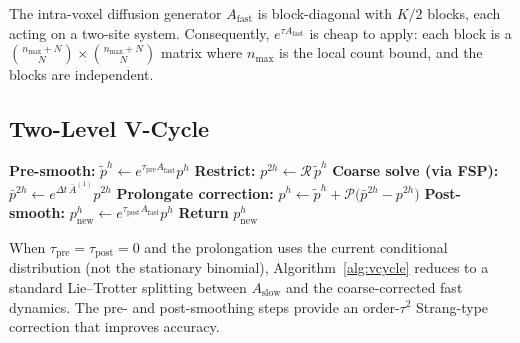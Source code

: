 \documentclass[review,onefignum,onetabnum]{siamart171218}
\newcommand{\calR}{\mathcal{R}}
\newcommand{\calP}{\mathcal{P}}
\begin{document}
The intra-voxel diffusion generator $A_{\mathrm{fast}}$ is
block-diagonal with $K/2$ blocks, each acting on a two-site
system.  Consequently, $e^{\tau A_{\mathrm{fast}}}$ is cheap to
apply: each block is a $\binom{n_{\max}+N}{N} \times \binom{n_{\max}+N}{N}$ matrix where $n_{\max}$ is the local count
bound, and the blocks are independent.

\subsection{Two-Level V-Cycle}

\begin{algorithm}[H]
  \caption{Two-Level Multigrid V-Cycle
    $\mathbf{MG2}(p^h, t, \Delta t; \tau_{\mathrm{pre}}, \tau_{\mathrm{post}})$}
  \label{alg:vcycle}
  \begin{algorithmic}[1]
    \STATE \textbf{Pre-smooth:}
      $\tilde{p}^h \leftarrow e^{\tau_{\mathrm{pre}} A_{\mathrm{fast}}} p^h$
    \STATE \textbf{Restrict:}
      $p^{2h} \leftarrow \calR\, \tilde{p}^h$
    \STATE \textbf{Coarse solve (via FSP):}
      $\bar{p}^{2h} \leftarrow e^{\Delta t\, \bar{A}^{(1)}} p^{2h}$
    \STATE \textbf{Prolongate correction:}
      $p^h \leftarrow \tilde{p}^h + \calP\bigl(\bar{p}^{2h} - p^{2h}\bigr)$
    \STATE \textbf{Post-smooth:}
      $p^h_{\mathrm{new}} \leftarrow e^{\tau_{\mathrm{post}} A_{\mathrm{fast}}} p^h$
    \STATE \textbf{Return} $p^h_{\mathrm{new}}$
  \end{algorithmic}
\end{algorithm}

\begin{remark}
  \label{rem:splitting}
  When $\tau_{\mathrm{pre}} = \tau_{\mathrm{post}} = 0$ and the
  prolongation uses the current conditional distribution (not the
  stationary binomial), Algorithm~\ref{alg:vcycle} reduces to
  a standard Lie--Trotter splitting between $A_{\mathrm{slow}}$
  and the coarse-corrected fast dynamics.  The pre- and
  post-smoothing steps provide an order-$\tau^2$ Strang-type
  correction that improves accuracy.
\end{remark}
\end{document}
